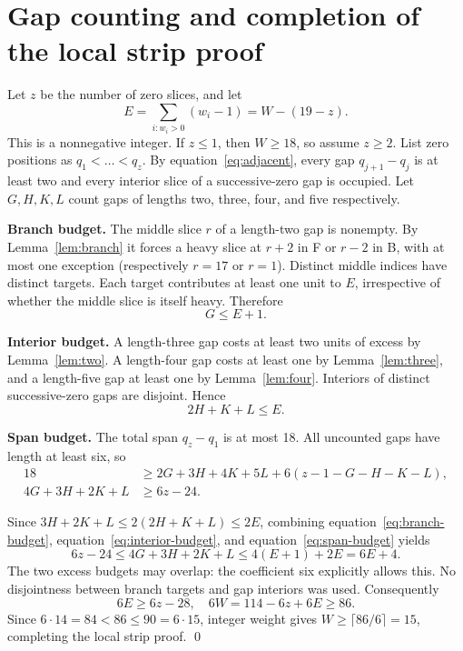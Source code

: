 \documentclass{article}
\begin{document}
\section{Gap counting and completion of the local strip proof}\label{sec:counting}

Let \(z\) be the number of zero slices, and let
\begin{equation}
  E=\sum_{i:w_i>0}(w_i-1)=W-(19-z).
\end{equation}
This is a nonnegative integer. If \(z\le 1\), then \(W\ge 18\), so assume
\(z\ge 2\). List zero positions as \(q_1<\dots<q_z\). By
equation~\eqref{eq:adjacent}, every gap
\(q_{j+1}-q_j\) is at least two and every interior slice of a successive-zero
gap is occupied. Let \(G,H,K,L\) count gaps of lengths two, three, four,
and five respectively.

\textbf{Branch budget.} The middle slice \(r\) of a length-two gap is nonempty.
By Lemma~\ref{lem:branch} it forces a heavy slice at \(r+2\) in F or \(r-2\) in
B, with at most one exception (respectively \(r=17\) or \(r=1\)). Distinct
middle indices have distinct targets. Each target contributes at least one unit
to \(E\), irrespective of whether the middle slice is itself heavy. Therefore
\begin{equation}\label{eq:branch-budget}
  G\le E+1.
\end{equation}

\textbf{Interior budget.} A length-three gap costs at least two units of excess
by Lemma~\ref{lem:two}. A length-four gap costs at least one by
Lemma~\ref{lem:three}, and a length-five gap at least one by
Lemma~\ref{lem:four}. Interiors of distinct successive-zero gaps are disjoint.
Hence
\begin{equation}\label{eq:interior-budget}
  2H+K+L\le E.
\end{equation}

\textbf{Span budget.} The total span \(q_z-q_1\) is at most 18. All uncounted
gaps have length at least six, so
\begin{equation}\label{eq:span-budget}
  \begin{aligned}
    18 &\ge 2G+3H+4K+5L+6(z-1-G-H-K-L), \\
    4G+3H+2K+L &\ge 6z-24.
  \end{aligned}
\end{equation}

Since \(3H+2K+L\le 2(2H+K+L)\le 2E\), combining
equation~\eqref{eq:branch-budget}, equation~\eqref{eq:interior-budget}, and
equation~\eqref{eq:span-budget} yields
\begin{equation}
  6z-24\le 4G+3H+2K+L\le 4(E+1)+2E=6E+4.
\end{equation}
The two excess budgets may overlap: the coefficient six explicitly allows
this. No disjointness between branch targets and gap interiors was used.
Consequently
\begin{equation}
  6E\ge 6z-28, \quad
  6W=114-6z+6E\ge 86.
\end{equation}
Since \(6\cdot 14=84<86\le 90=6\cdot 15\), integer weight gives
\(W\ge\lceil 86/6\rceil=15\), completing the local strip proof.
\qed
\end{document}

